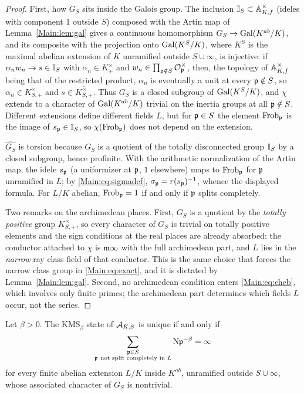 \begin{proof}
First, how $G_S$ sits inside the Galois group. The inclusion $\mathbb{I}_S\subset\mathbb{A}_{K,f}^\times$
(ideles with component $1$ outside $S$) composed with the Artin map of Lemma~\ref{Main:lem:gal}
gives a continuous homomorphism $G_S\to\operatorname{Gal}(K^{ab}/K)$, and its composite with the
projection onto $\operatorname{Gal}(K^{S}/K)$, where $K^{S}$ is the maximal abelian extension of $K$
unramified outside $S\cup\infty$, is injective: if $\alpha_nw_n\to s\in\mathbb{I}_S$ with
$\alpha_n\in K^\times_+$ and $w_n\in\prod_{\mathfrak{p}\notin S}\mathcal{O}_{\mathfrak{p}}^\times$, then, the topology
of $\mathbb{A}_{K,f}^\times$ being that of the restricted product, $\alpha_n$ is eventually a unit at
every $\mathfrak{p}\notin S$, so $\alpha_n\in K^\times_{S,+}$ and $s\in\overline{K^\times_{S,+}}$.
Thus $G_S$ is a closed subgroup of $\operatorname{Gal}(K^{S}/K)$, and $\chi$ extends to a character of
$\operatorname{Gal}(K^{ab}/K)$ trivial on the inertia groups at all $\mathfrak{p}\notin S$. Different extensions
define different fields $L$, but for $\mathfrak{p}\in S$ the element $\operatorname{Frob}_{\mathfrak{p}}$ is the image of
$s_{\mathfrak{p}}\in\mathbb{I}_S$, so $\chi(\operatorname{Frob}_{\mathfrak{p}})$ does not depend on the extension.

$\widehat{G_S}$ is torsion because $G_S$ is a quotient of the totally
disconnected group $\mathbb{I}_S$ by a closed subgroup, hence profinite. With the arithmetic
normalization of the Artin map, the idele $s_{\mathfrak{p}}$ (a uniformizer at $\mathfrak{p}$,
$1$ elsewhere) maps to $\operatorname{Frob}_{\mathfrak{p}}$ for $\mathfrak{p}$ unramified in $L$; by
\eqref{Main:eq:sigmadef}, $\sigma_{\mathfrak{p}}=r(s_{\mathfrak{p}})^{-1}$, whence the displayed formula.
For $L/K$ abelian, $\operatorname{Frob}_{\mathfrak{p}}=1$ if and only if $\mathfrak{p}$ splits completely.

Two remarks on the archimedean places. First, $G_S$ is a quotient by the \emph{totally
positive} group $K^\times_{S,+}$, so every character of $G_S$ is trivial on totally
positive elements and the sign conditions at the real places are already absorbed: the
conductor attached to $\chi$ is $\mathfrak{m}\infty$ with the full archimedean part, and $L$ lies
in the \emph{narrow} ray class field of that conductor. This is the same choice that
forces the narrow class group in \eqref{Main:eq:exact}, and it is dictated by
Lemma~\ref{Main:lem:gal}. Second, no archimedean condition enters \eqref{Main:eq:cheb}, which
involves only finite primes; the archimedean part determines which fields $L$ occur, not
the series.
\end{proof}

\begin{theorem}\label{Main:thm:cheb}
Let $\beta>0$. The $\mathrm{KMS}_\beta$ state of $\mathcal{A}_{K,S}$ is unique if and
only if
\begin{equation}\label{Main:eq:cheb}
\sum_{\substack{\mathfrak{p}\in S\\ \mathfrak{p}\ \text{not split completely in }L}}\mathrm{N}\mathfrak{p}^{-\beta}=\infty
\end{equation}
for every finite abelian extension $L/K$ inside $K^{ab}$, unramified outside
$S\cup\infty$, whose associated character of $G_S$ is nontrivial.
\end{theorem}

